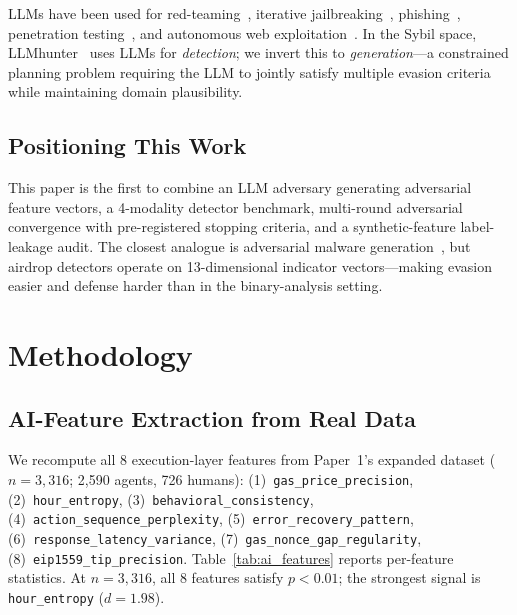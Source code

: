 \documentclass[sigconf,nonacm=false]{acmart}
\begin{document}
LLMs have been used for red-teaming~\cite{perez2022redteam}, iterative jailbreaking~\cite{chao2023jailbreaking}, phishing~\cite{heiding2024}, penetration testing~\cite{deng2024llm_pentesting}, and autonomous web exploitation~\cite{fang2024llm_agents_attack}.
In the Sybil space, LLMhunter~\cite{llmhunter} uses LLMs for \textit{detection}; we invert this to \textit{generation}---a constrained planning problem requiring the LLM to jointly satisfy multiple evasion criteria while maintaining domain plausibility.

\subsection{Positioning This Work}

This paper is the first to combine an LLM adversary generating adversarial feature vectors, a 4-modality detector benchmark, multi-round adversarial convergence with pre-registered stopping criteria, and a synthetic-feature label-leakage audit.
The closest analogue is adversarial malware generation~\cite{pierazzi2020}, but airdrop detectors operate on 13-dimensional indicator vectors---making evasion easier and defense harder than in the binary-analysis setting.


\section{Methodology}
\label{sec:methods}

\subsection{AI-Feature Extraction from Real Data}
\label{sec:methods:features}

We recompute all 8 execution-layer features from Paper~1's expanded dataset ($n{=}3{,}316$; 2,590 agents, 726 humans):
(1)~\texttt{gas\_price\_precision},
(2)~\texttt{hour\_entropy},
(3)~\texttt{behavioral\_consistency},
(4)~\texttt{action\_sequence\_perplexity},
(5)~\texttt{error\_recovery\_pattern},
(6)~\texttt{response\_latency\_variance},
(7)~\texttt{gas\_nonce\_gap\_regularity},
(8)~\texttt{eip1559\_tip\_precision}.
Table~\ref{tab:ai_features} reports per-feature statistics. At $n{=}3{,}316$, all 8 features satisfy $p{<}0.01$; the strongest signal is \texttt{hour\_entropy} ($d{=}1.98$).
\end{document}
